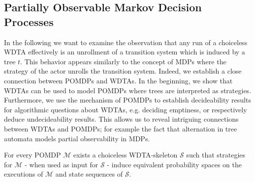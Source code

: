 \subsection{Partially Observable Markov Decision Processes}
In the following we want to examine the observation that any run of a
choiceless \ac{WDTA} effectively is an unrollment of a transition system
which is induced by a tree $t$. This behavior appears similarly to the
concept of \acp{MDP} where the strategy of the actor unrolls the transition
system. Indeed, we establish a close connection between \acp{POMDP} and
\acp{WDTA}. In the beginning, we show that \acp{WDTA} can be used to model
\acp{POMDP} where trees are interpreted as strategies. Furthermore, we use the
mechanism of \acp{POMDP} to establish decideability results for algorithmic
questions about \acp{WDTA}, e.g. deciding emptiness, or respectively deduce
undecideability results. This allows us to reveal intriguing connections
between \acp{WDTA} and \acp{POMDP}; for example the fact that alternation in
tree automata models partial observability in \acp{MDP}.
\begin{theorem}
  For every \ac{POMDP} $\mathcal{M}$ exists a choiceless \ac{WDTA}-skeleton 
  $\mathcal{S}$ such that strategies for $\mathcal{M}$ - when used as input
  for $\mathcal{S}$ - induce equivalent probability spaces on the executions of 
  $\mathcal{M}$ and state sequences of $\mathcal{S}$.
  \label{thm:POMDPequivWDTA}
\end{theorem}
